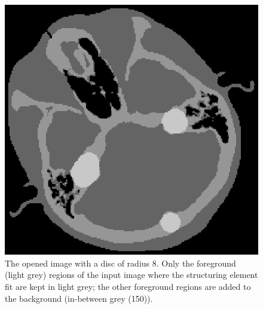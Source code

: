 \documentclass{InsightArticle}
\begin{document}
\begin{figure}
\centering
\includegraphics{open.eps}
\caption{The opened image with a disc of radius 8. Only the foreground (light
grey) regions of the input image where the structuring element fit are kept in
light grey; the other foreground regions are added to the background (in-between
grey (150)).\label{open}}
\end{figure}
\end{document}
